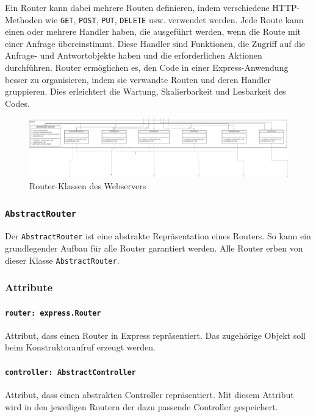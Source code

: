\documentclass{entwurfsheft}
\begin{document}
Ein Router kann dabei mehrere Routen definieren, indem verschiedene HTTP-Methoden wie \texttt{GET}, \texttt{POST}, \texttt{PUT}, \texttt{DELETE} usw. verwendet werden.
Jede Route kann einen oder mehrere Handler haben, die ausgeführt werden, wenn die Route mit einer Anfrage übereinstimmt.
Diese Handler sind Funktionen, die Zugriff auf die Anfrage- und Antwortobjekte haben und die erforderlichen Aktionen durchführen.
Router ermöglichen es, den Code in einer Express-Anwendung besser zu organisieren, indem sie verwandte Routen und deren Handler gruppieren.
Dies erleichtert die Wartung, Skalierbarkeit und Lesbarkeit des Codes.

\begin{figure}[htp]
    \centering
    \includegraphics[width = 1\textwidth]{images/webserver/router.pdf}
    \caption{Router-Klassen des Webservers}
    \label{fig:router}
\end{figure}

\subsubsection{\texttt{AbstractRouter}}\label{sec:AbstractRouter}
Der \texttt{AbstractRouter} ist eine abstrakte Repräsentation eines Routers. So kann ein grundlegender Aufbau für alle Router garantiert werden. Alle Router erben von dieser Klasse \texttt{AbstractRouter}.
\subsubsection*{Attribute}
\paragraph{\texttt{router: express.Router}}
Attribut, dass einen Router in Express repräsentiert. Das zugehörige Objekt soll beim Konstruktoraufruf erzeugt werden. 
\paragraph{\texttt{controller: AbstractController}}
Attribut, dass einen abstrakten Controller repräsentiert. Mit diesem Attribut wird in den jeweiligen Routern der dazu passende Controller gespeichert.
\end{document}
